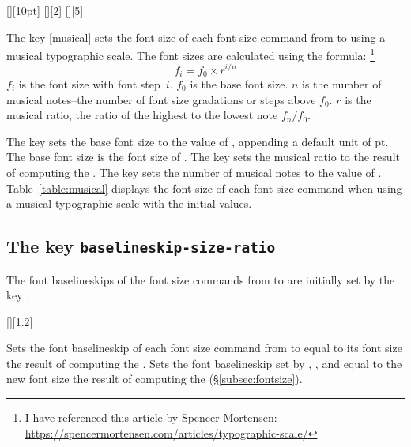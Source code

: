 \documentclass{beery}
\begin{document}
[][10pt]%
\nopagebreak\newline
{}[][2]%
\nopagebreak\newline
{}[][5]

The key [musical] sets the font size of each font size command from  to  using a musical typographic scale.
The font sizes are calculated using the formula:%
\footnote
  {%
    I have referenced this article by Spencer Mortensen:
    \newline
    \url{https://spencermortensen.com/articles/typographic-scale/}%
  }
\begin{equation}\label{eq:musical}
  f_i = f_0 \times r ^ { i / n }
\end{equation}
$f_i$ is the font size with font step~$i$.
$f_0$ is the base font size.
$n$ is the number of musical notes\---the number of font size gradations or steps above $f_0$.
$r$ is the musical ratio, the ratio of the highest to the lowest note $ f_n / f_0 $.

The key  sets the base font size to the value of , appending a default unit of \unit{pt}.
The base font size is the font size of .
The key  sets the musical ratio to the result of computing the .
The key  sets the number of musical notes to the value of .
Table~\ref{table:musical} displays the font size of each font size command when using a musical typographic scale with the initial values.



\subsection
  {%
    The key
    \texorpdfstring
      {\texttt{baselineskip-size-ratio}}
      {baselineskip-size-ratio}%
  }
\label{subsec:baselineskipsizeratio}

The font baselineskips of the font size commands from  to  are initially set by the key .

[][1.2]
\KeepNextPar*

Sets the font baselineskip of each font size command from  to  equal to its font size \texttimes{} the result of computing the .
Sets the font baselineskip set by , , and  equal to the new font size \texttimes{} the result of computing the  (\S\ref{subsec:fontsize}).
\end{document}

